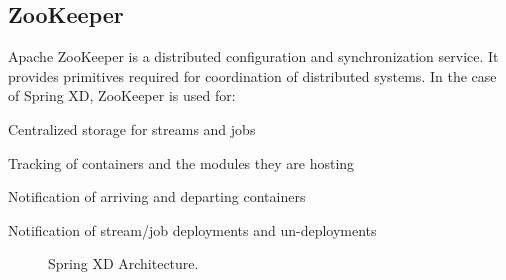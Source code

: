 \subsection{ZooKeeper}
Apache ZooKeeper is a distributed configuration and synchronization service. It provides primitives required for coordination of distributed systems. In the case of Spring XD, ZooKeeper is used for: \begin{itemize*}
	\item Centralized storage for streams and jobs
	\item Tracking of containers and the modules they are hosting
	\item Notification of arriving and departing containers
	\item Notification of stream/job deployments and un-deployments
\end{itemize*}
\begin{figure}[ht]
\centering
{}
\caption{Spring XD Architecture.}
\label{fig:architecture}
\end{figure}

